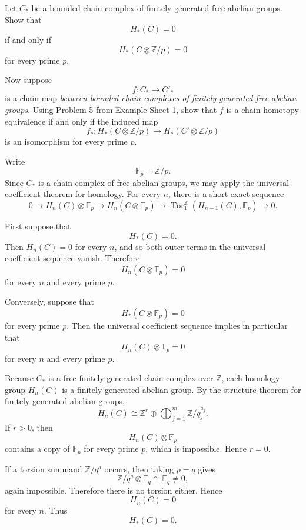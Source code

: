\begin{problem}
Let \(C_*\) be a bounded chain complex of finitely generated free abelian groups. Show that
\[
H_*(C)=0
\]
if and only if
\[
H_*(C\otimes \mathbb Z/p)=0
\]
for every prime \(p\).

Now suppose
\[
f:C_* \longrightarrow C'_*
\]
is a chain map \emph{between bounded chain complexes of finitely generated free abelian groups}. Using Problem 5 from Example Sheet 1, show that \(f\) is a chain homotopy equivalence if and only if the induced map
\[
f_*:H_*(C\otimes \mathbb Z/p)\longrightarrow H_*(C'\otimes \mathbb Z/p)
\]
is an isomorphism for every prime \(p\).
\end{problem}

\begin{solution}
Write
\[
\mathbb F_p=\mathbb Z/p.
\]
Since \(C_*\) is a chain complex of free abelian groups, we may apply the universal coefficient theorem for homology. For every \(n\), there is a short exact sequence
\[
0
\longrightarrow
H_n(C)\otimes \mathbb F_p
\longrightarrow
H_n(C\otimes \mathbb F_p)
\longrightarrow
\operatorname{Tor}_1^{\mathbb Z}(H_{n-1}(C),\mathbb F_p)
\longrightarrow
0.
\]

First suppose that
\[
H_*(C)=0.
\]
Then \(H_n(C)=0\) for every \(n\), and so both outer terms in the universal coefficient sequence vanish. Therefore
\[
H_n(C\otimes \mathbb F_p)=0
\]
for every \(n\) and every prime \(p\).

Conversely, suppose that
\[
H_*(C\otimes \mathbb F_p)=0
\]
for every prime \(p\). Then the universal coefficient sequence implies in particular that
\[
H_n(C)\otimes \mathbb F_p=0
\]
for every \(n\) and every prime \(p\).

Because \(C_*\) is a free finitely generated chain complex over \(\mathbb Z\), each homology group \(H_n(C)\) is a finitely generated abelian group. By the structure theorem for finitely generated abelian groups,
\[
H_n(C)\cong \mathbb Z^r\oplus
\bigoplus_{j=1}^m \mathbb Z/q_j^{a_j}.
\]
If \(r>0\), then
\[
H_n(C)\otimes \mathbb F_p
\]
contains a copy of \(\mathbb F_p\) for every prime \(p\), which is impossible. Hence \(r=0\).

If a torsion summand \(\mathbb Z/q^a\) occurs, then taking \(p=q\) gives
\[
\mathbb Z/q^a\otimes \mathbb F_q \cong \mathbb F_q\neq 0,
\]
again impossible. Therefore there is no torsion either. Hence
\[
H_n(C)=0
\]
for every \(n\). Thus
\[
H_*(C)=0.
\]


\end{solution}
